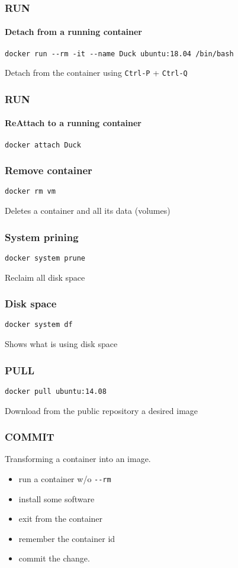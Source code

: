 \begin{frame}[fragile]
\frametitle{RUN}
\framesubtitle{Detach from a running container}

\begin{lstlisting}
docker run --rm -it --name Duck ubuntu:18.04 /bin/bash
\end{lstlisting}
Detach from the container using \lstinline!Ctrl-P! + \lstinline!Ctrl-Q!
\end{frame}

\begin{frame}[fragile]
\frametitle{RUN}
\framesubtitle{ReAttach to a running container}
\begin{lstlisting}
docker attach Duck
\end{lstlisting}
\end{frame}

\begin{frame}[fragile]
\frametitle{Remove container}
\begin{lstlisting}
docker rm vm
\end{lstlisting}
Deletes a container and all its data (volumes) 
\end{frame}

\begin{frame}[fragile]
\frametitle{System prining}
\begin{lstlisting}
docker system prune
\end{lstlisting}

Reclaim all disk space
\end{frame}

\begin{frame}[fragile]
\frametitle{Disk space}
\begin{lstlisting}
docker system df
\end{lstlisting}
Shows what is using disk space
\end{frame}

\begin{frame}[fragile]
\frametitle{PULL}
\begin{lstlisting}
docker pull ubuntu:14.08
\end{lstlisting}

Download from the public repository a desired image
\end{frame}

\begin{frame}[fragile]
\frametitle{COMMIT}
Transforming a container into an image.
\begin{itemize}
\item run a container w/o \lstinline!--rm!
\item install some software
\item exit from the container
\item remember the container id
\item commit the change.
\end{itemize}
\end{frame}

